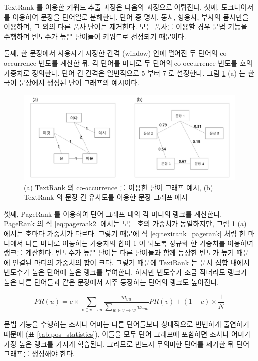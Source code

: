 \documentclass[oneside, ko,phd]{snuthesis_utf8_kor}
\begin{document}
TextRank 를 이용한 키워드 추출 과정은 다음의 과정으로 이뤄진다.
첫째, 토크나이저를 이용하여 문장을 단어열로 분해한다.
단어 중 명사, 동사, 형용사, 부사의 품사만을 이용하며, 그 외의 다른 품사 단어는 제거한다.
모든 품사를 이용할 경우 문법 기능을 수행하며 빈도수가 높은 단어들이 키워드로 선정되기 때문이다.

둘째, 한 문장에서 사용자가 지정한 간격 (window) 안에 떨어진 두 단어의 co-occurrence 빈도를 계산한 뒤, 각 단어를 마디로 두 단어의 co-occurrence 빈도를 호의 가중치로 정의한다.
단어 간 간격은 일반적으로 5 부터 7 로 설정한다.
그림 \ref{fig:textrank} (a) 는 한국어 문장에서 생성된 단어 그래프의 예시이다.

\begin{figure}[H]
\centering
\includegraphics[keepaspectratio=true, width=0.9\linewidth]{fig/keyword_textrank.png}
\caption{(a) TextRank 의 co-occurrence 를 이용한 단어 그래프 예시, (b) TextRank 의 문장 간 유사도를 이용한 문장 그래프 예시}
\label{fig:textrank}
\end{figure}

셋째, PageRank \cite{ilprints422} 를 이용하여 단어 그래프 내의 각 마디의 랭크를 계산한다.
PageRank 의 식 \ref{eq:pagerank2} 에서는 모든 호의 가중치가 동일하지만, 그림 \ref{fig:textrank} (a) 에서는 호마다 가중치가 다르다.
그렇기 때문에 식 \ref{eq:textrank_pagerank} 처럼 한 마디에서 다른 마디로 이동하는 가중치의 합이 1 이 되도록 정규화 한 가중치를 이용하여 랭크를 계산한다.
빈도수가 높은 단어는 다른 단어들과 함께 등장한 빈도가 높기 때문에 연결된 마디의 가중치의 합이 크다.
그렇기 때문에 TextRank 는 문서 집합 내에서 빈도수가 높은 단어에 높은 랭크를 부여한다.
하지만 빈도수가 조금 작더라도 랭크가 높은 다른 단어들과 같은 문장에서 자주 등장하는 단어의 랭크도 높아진다.

\begin{equation}
\label{eq:textrank_pagerank}
PR(u) = c \times \sum_{v \in v \rightarrow u} \frac{w_{vu}}{\sum_{w \in v \rightarrow w} w_{vw}} PR(v) + (1-c) \times \frac{1}{N}
\end{equation}

문법 기능을 수행하는 조사나 어미는 다른 단어들보다 상대적으로 빈번하게 출연하기 때문에 (표 \ref{tab:pos_statistics}), 이들을 모두 단어 그래프에 포함하면 조사나 어미가 가장 높은 랭크를 가지게 학습된다.
그러므로 반드시 무의미한 단어를 제거한 뒤 단어 그래프를 생성해야 한다.
\end{document}
